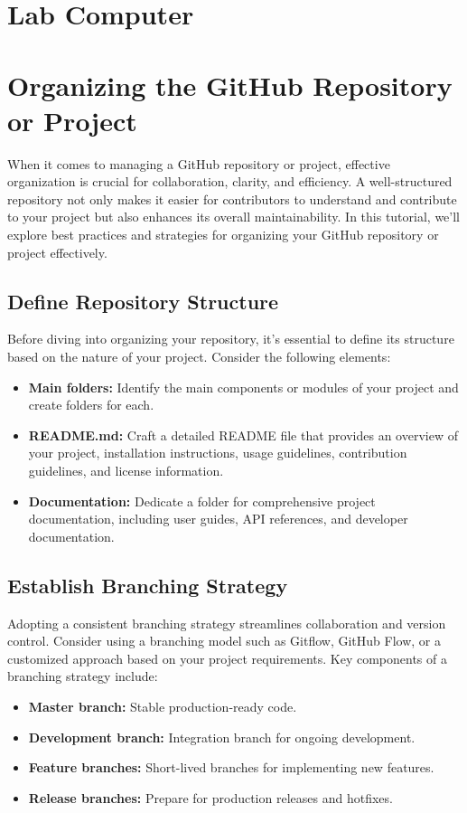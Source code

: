 \documentclass[hidelinks]{article}
\begin{document}
\section*{Lab Computer}

\section*{Organizing the GitHub Repository or Project}
When it comes to managing a GitHub repository or project, effective organization is crucial for collaboration, clarity, and efficiency. A well-structured repository not only makes it easier for contributors to understand and contribute to your project but also enhances its overall maintainability. In this tutorial, we'll explore best practices and strategies for organizing your GitHub repository or project effectively.

\subsection*{Define Repository Structure}
Before diving into organizing your repository, it's essential to define its structure based on the nature of your project. Consider the following elements:

\begin{itemize}
    \item \textbf{Main folders:} Identify the main components or modules of your project and create folders for each.
    \item \textbf{README.md:} Craft a detailed README file that provides an overview of your project, installation instructions, usage guidelines, contribution guidelines, and license information.
    \item \textbf{Documentation:} Dedicate a folder for comprehensive project documentation, including user guides, API references, and developer documentation.
\end{itemize}

\subsection*{Establish Branching Strategy}
Adopting a consistent branching strategy streamlines collaboration and version control. Consider using a branching model such as Gitflow, GitHub Flow, or a customized approach based on your project requirements. Key components of a branching strategy include:

\begin{itemize}
    \item \textbf{Master branch:} Stable production-ready code.
    \item \textbf{Development branch:} Integration branch for ongoing development.
    \item \textbf{Feature branches:} Short-lived branches for implementing new features.
    \item \textbf{Release branches:} Prepare for production releases and hotfixes.
\end{itemize}
\end{document}
